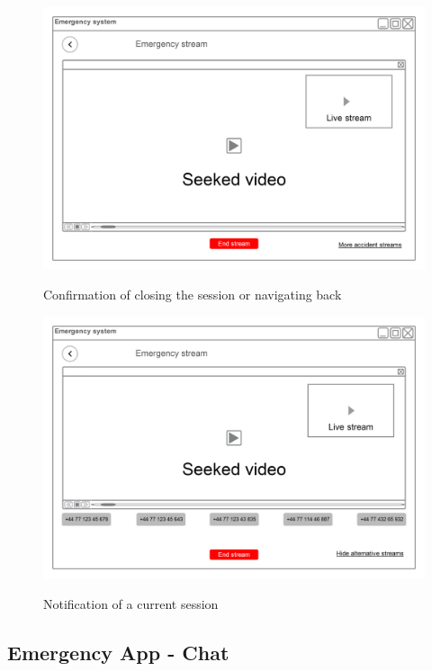 \documentclass{article}
\begin{document}
	\begin{figure}[H]
		\centering
		\includegraphics[width=.9\textwidth]{"EmergencyAppIteration5/more_accident_streams_iteration3 (1)"}
		
		Confirmation of closing the session or navigating back
	\end{figure}
	\begin{figure}[H]
		\centering
		\includegraphics[width=.9\textwidth]{"EmergencyAppIteration5/more_accident_streams_opened_iteration3"}
		
		 Notification of a current session
	\end{figure}



\pagebreak
\pagebreak
	\subsection{Emergency App - Chat}
\end{document}
